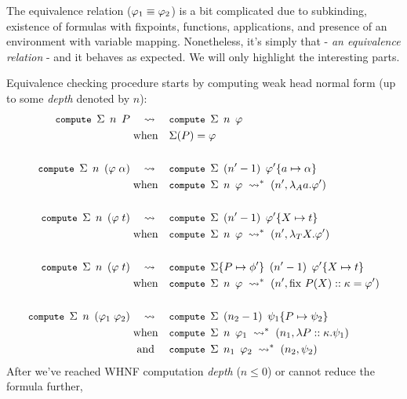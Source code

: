 \documentclass[english, mgr]{iithesis}
\renewcommand{\tt}[1]{\texttt{\small{#1}}}
\begin{document}
The equivalence relation ($\varphi_1 \equiv \varphi_2$) is a bit complicated
due to subkinding, existence of formulas
with fixpoints, functions, applications,
and presence of an environment with variable mapping.
Nonetheless, it's simply that - \textit{an equivalence relation} - and it
behaves as expected. We will only highlight the interesting parts.

Equivalence checking procedure starts by computing weak head normal form (up to some \textit{depth} denoted by $n$):
\begin{align*}
\tt{compute }\Sigma\tt{ }n\tt{ }P
& \quad\leadsto\quad
\tt{compute }\Sigma\tt{ }n\tt{ }\formphi
\\
&\;\text{when} \quad \Sigma(P) = \formphi
\\ & \\
\tt{compute }\Sigma\tt{ }n\tt{ }{(\formphi \fAppAtom \atomexp )}
& \quad\leadsto\quad
\tt{compute }\Sigma\tt{ }(n' - 1)\tt{ }{\formphi'\subst{\atomv}{\atomexp}} \\
&\;\text{when} \quad \tt{compute }\Sigma\tt{ }n\tt{ }{\formphi} \;\leadsto^{*}\; (n',\fLamAtom{\atomv}\formphi')
\\ & \\
\tt{compute }\Sigma\tt{ }n\tt{ }{(\formphi \fAppTerm \term )}
& \quad\leadsto\quad
\tt{compute }\Sigma\tt{ }(n' - 1)\tt{ }{\formphi'\subst{\termv}{\term}} \\
&\;\text{when} \quad \tt{compute }\Sigma\tt{ }n\tt{ }{\formphi} \;\leadsto^{*}\; (n',\fLamTerm{\termv}\formphi')
\\ & \\
\tt{compute }\Sigma\tt{ }n\tt{ }{(\formphi \fAppTerm \term )}
& \quad\leadsto\quad
\tt{compute }\Sigma\subst{P}{\phi'}\tt{ }(n' - 1)\tt{ }{\formphi'\subst{\termv}{\term}}\\
&\;\text{when} \quad \tt{compute }\Sigma\tt{ }n\tt{ }{\formphi} \;\leadsto^{*}\; (n',\fix{P}{\termv}{\kind}\formphi')
\\ & \\
\tt{compute }\Sigma\tt{ }n\tt{ }{(\formphi_1 \fApp \formphi_2 )}
& \quad\leadsto\quad
\tt{compute }\Sigma\tt{ }(n_2 - 1)\tt{ }{\psi_1\subst{\propv}{\psi_2}}\\
&\;\text{when} \quad \tt{compute }\Sigma\tt{ }n\tt{ }{\formphi_1} \;\leadsto^{*}\; (n_1, \fLamForm{\propv}{\kind}{\psi_1})\\
&\;\text{ and } \quad \tt{compute }\Sigma\tt{ }n_1\tt{ }{\formphi_2} \;\leadsto^{*}\; (n_2, \psi_2)
\end{align*}
After we've reached WHNF computation \textit{depth} ($ n \leqslant 0$) or cannot reduce the formula further,
\end{document}
